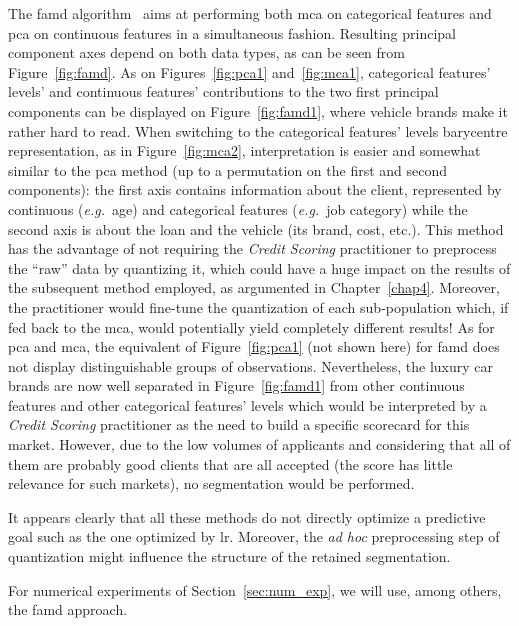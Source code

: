 The \gls{famd} algorithm~\cite{pages2014multiple} aims at performing both \gls{mca} on categorical features and \gls{pca} on continuous features in a simultaneous fashion. Resulting principal component axes depend on both data types, as can be seen from Figure~\ref{fig:famd}. As on Figures~\ref{fig:pca1} and~\ref{fig:mca1}, categorical features' levels' and continuous features' contributions to the two first principal components can be displayed on Figure~\ref{fig:famd1}, where vehicle brands make it rather hard to read. When switching to the categorical features' levels barycentre representation, as in Figure~\ref{fig:mca2}, interpretation is easier and somewhat similar to the \gls{pca} method (up to a permutation on the first and second components): the first axis contains information about the client, represented by continuous (\textit{e.g.}\ age) and categorical features (\textit{e.g.}\ job category) while the second axis is about the loan and the vehicle (its brand, cost, etc.).
This method has the advantage of not requiring the \textit{Credit Scoring} practitioner to preprocess the ``raw'' data by quantizing it, which could have a huge impact on the results of the subsequent method employed, as argumented in Chapter~\ref{chap4}. Moreover, the practitioner would fine-tune the quantization of each sub-population which, if fed back to the \gls{mca}, would potentially yield completely different results! As for \gls{pca} and \gls{mca}, the equivalent of Figure~\ref{fig:pca1} (not shown here) for \gls{famd} does not display distinguishable groups of observations. Nevertheless, the luxury car brands are now well separated in Figure~\ref{fig:famd1} from other continuous features and other categorical features' levels which would be interpreted by a \textit{Credit Scoring} practitioner as the need to build a specific scorecard for this market. However, due to the low volumes of applicants and considering that all of them are probably good clients that are all accepted (the score has little relevance for such markets), no segmentation would be performed.

\medskip

It appears clearly that all these methods do not directly optimize a predictive goal such as the one optimized by \gls{lr}. Moreover, the \textit{ad hoc} preprocessing step of quantization might influence the structure of the retained segmentation. 

For numerical experiments of Section~\ref{sec:num_exp}, we will use, among others, the \gls{famd} approach.

